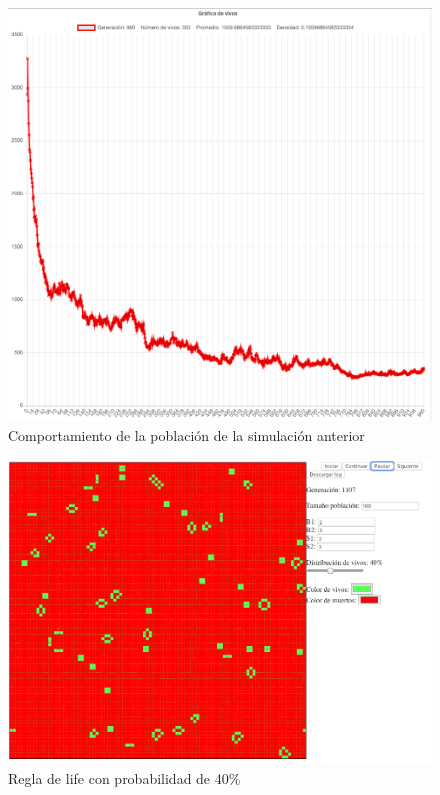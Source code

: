 	\begin{figure}[H]
		\begin{center}
			\includegraphics[scale=.24]{GOL/img/life30-2.png}
			\caption{Comportamiento de la población de la simulación anterior}
			\label{fig:gol5}
		\end{center}
	\end{figure}

	\begin{figure}[H]
		\begin{center}
			\includegraphics[scale=.3]{GOL/img/life40-1.png}
			\caption{Regla de life con probabilidad de 40\%}
			\label{fig:gol5}
		\end{center}
	\end{figure}

